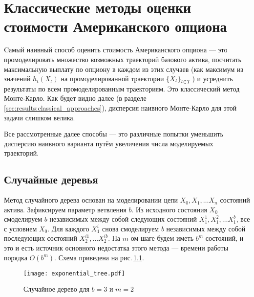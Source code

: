 \chapter{Классические методы оценки стоимости Американского опциона} %
\label{cha:classic_approaches_to_option_pricing}

Cамый наивный способ оценить стоимость Американского опциона --- это промоделировать множество возможных траекторий базового актива, посчитать максимальную выплату по опциону в каждом из этих случаев (как максимум из значений $h_t(X_t)$ на промоделированной траектории $\left\{ X_t \right\}_{t \in \mathcal{T}}$) и усреднить результаты по всем промоделированным траекториям. Это классический метод Монте-Карло. Как будет видно далее (в разделе \ref{sec:results:classical_approaches}), дисперсия наивного Монте-Карло для этой задачи слишком велика.

Все рассмотренные далее способы --- это различные попытки уменьшить дисперсию наивного варианта путём увеличения числа моделируемых траекторий. 

\section{Случайные деревья} %
\label{sec:classic_approaches:tree_estimator}

Метод случайного дерева основан на моделировании цепи $X_0, X_1, \ldots X_n$ состояний актива. Зафиксируем параметр ветвления $b$. Из исходного состояния $X_0$ смоделируем $b$ независимых между собой следующих состояний $X_1^1, X_1^2, \ldots X_1^b$, все с условием $X_0$. Для каждого $X_1^i$ снова смоделируем $b$ независимых между собой последующих состояний $X_2^{i1}, \ldots X_2^{ib}$. На $m$-ом шаге будем иметь $b^m$ состояний, и это и есть источник основного недостатка этого метода --- времени работы порядка $O(b^m)$. Схема приведена на рис.\,\ref{fig:exponential_tree}.
\begin{figure}[b]
    \centering
    \texttt{[image: exponential\_tree.pdf]}
    \caption{Случайное дерево для $b = 3$ и $m = 2$}
    \label{fig:exponential_tree}
\end{figure}

